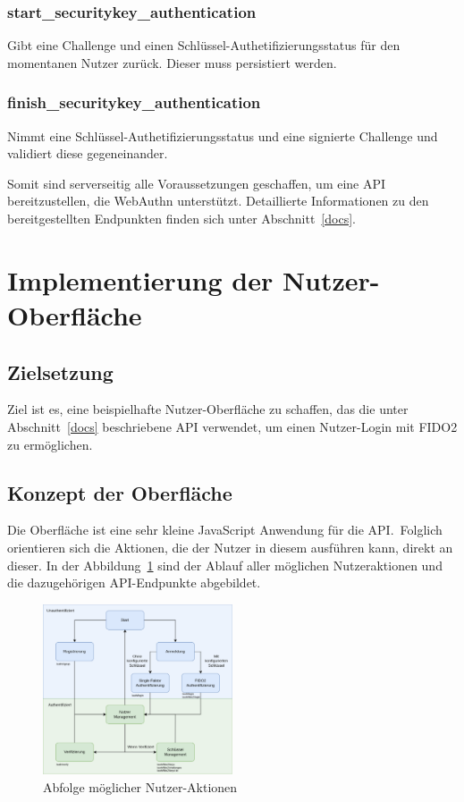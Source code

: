 \documentclass[journal]{IEEEtran}
\begin{document}
\subsubsection{start\_securitykey\_authentication}
Gibt eine Challenge und einen Schlüssel-Authetifizierungsstatus für den
momentanen Nutzer zurück. Dieser muss persistiert werden.

\subsubsection{finish\_securitykey\_authentication}
Nimmt eine Schlüssel-Authetifizierungsstatus und eine signierte Challenge und
validiert diese gegeneinander.

Somit sind serverseitig alle Voraussetzungen geschaffen, um eine API
bereitzustellen, die WebAuthn unterstützt. Detaillierte Informationen zu den
bereitgestellten Endpunkten finden sich unter Abschnitt~\ref{docs}.

\section{Implementierung der Nutzer-Oberfläche}

\subsection{Zielsetzung}

Ziel ist es, eine beispielhafte Nutzer-Oberfläche zu schaffen, das die unter
Abschnitt~\ref{docs} beschriebene API verwendet, um einen Nutzer-Login mit
FIDO2 zu ermöglichen.

\subsection{Konzept der Oberfläche}

Die Oberfläche ist eine sehr kleine JavaScript Anwendung für die API.\ Folglich
orientieren sich die Aktionen, die der Nutzer in diesem ausführen kann, direkt
an dieser. In der Abbildung~\ref{fig:ui-flow} sind der Ablauf aller möglichen
Nutzeraktionen und die dazugehörigen API-Endpunkte abgebildet.

\begin{figure}[ht]
	\includegraphics[width=0.5\textwidth]{ui-flow.png}
	\centering
	\caption{Abfolge möglicher Nutzer-Aktionen}\label{fig:ui-flow}
\end{figure}
\end{document}
